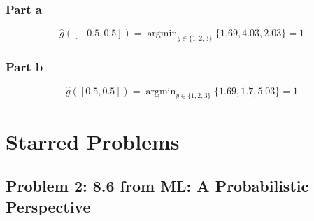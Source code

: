 \documentclass{article}
\newcommand{\argmin}{\mathop{\mathrm{argmin}}}
\begin{document}
\begin{flushleft}
\subsubsection*{Part a}
\begin{equation}
\hat{g}([-0.5, 0.5]) = \argmin_{y \in \{1, 2, 3\}} \{1.69, 4.03, 2.03\} = 1
\end{equation}

\subsubsection*{Part b}
\begin{equation}
\hat{g}([0.5, 0.5]) = \argmin_{y \in \{1, 2, 3\}} \{1.69, 1.7, 5.03\} = 1
\end{equation}
\end{flushleft}

\section*{Starred Problems}
\subsection*{Problem 2: 8.6 from ML: A Probabilistic Perspective}
\end{document}
